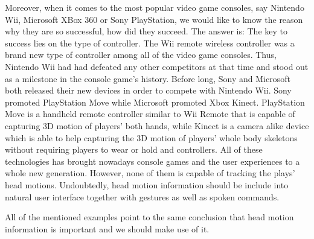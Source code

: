 Moreover, when it comes to the most popular video game consoles, say Nintendo Wii, Microsoft XBox 360 or Sony PlayStation, we would like to know the reason why they are so successful, how did they succeed. The answer is: The key to success lies on the type of controller. The Wii remote wireless controller was a brand new type of controller among all of the video game consoles. Thus, Nintendo Wii had had defeated any other competitors at that time and stood out as a milestone in the console game's history. Before long, Sony and Microsoft both released their new devices in order to compete with Nintendo Wii. Sony promoted PlayStation Move while Microsoft promoted Xbox Kinect. PlayStation Move is a handheld remote controller similar to Wii Remote that is capable of capturing 3D motion of players' both hands, while Kinect is a camera alike device which is able to help capturing the 3D motion of players' whole body skeletons without requiring players to wear or hold and controllers. All of these technologies has brought nowadays console games and the user experiences to a whole new generation. However, none of them is capable of tracking the plays' head motions. Undoubtedly, head motion information should be include into natural user interface together with gestures as well as spoken commands.

All of the mentioned examples point to the same conclusion that head motion information is important and we should make use of it.
